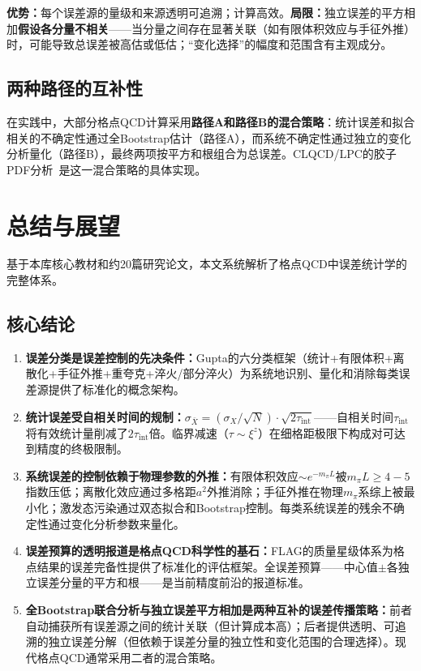\documentclass[12pt,a4paper]{ctexart}
\begin{document}
\textbf{优势：}每个误差源的量级和来源透明可追溯；计算高效。\textbf{局限：}独立误差的平方相加\textbf{假设各分量不相关}——当分量之间存在显著关联（如有限体积效应与手征外推）时，可能导致总误差被高估或低估；``变化选择''的幅度和范围含有主观成分。

\subsection{两种路径的互补性}

在实践中，大部分格点QCD计算采用\textbf{路径A和路径B的混合策略}：统计误差和拟合相关的不确定性通过全Bootstrap估计（路径A），而系统不确定性通过独立的变化分析量化（路径B），最终两项按平方和根组合为总误差。CLQCD/LPC的胶子PDF分析~\cite{Chen2025gluon}是这一混合策略的具体实现。

\section{总结与展望}

基于本库核心教材和约20篇研究论文，本文系统解析了格点QCD中误差统计学的完整体系。

\subsection*{核心结论}

\begin{enumerate}[leftmargin=*]
    \item \textbf{误差分类是误差控制的先决条件：}Gupta的六分类框架（统计+有限体积+离散化+手征外推+重夸克+淬火/部分淬火）为系统地识别、量化和消除每类误差源提供了标准化的概念架构。

    \item \textbf{统计误差受自相关时间的规制：}$\sigma_{\bar X} = (\sigma_X/\sqrt{N})\cdot\sqrt{2\tau_{\text{int}}}$——自相关时间$\tau_{\text{int}}$将有效统计量削减了$2\tau_{\text{int}}$倍。临界减速（$\tau\sim\xi^z$）在细格距极限下构成对可达到精度的终极限制。

    \item \textbf{系统误差的控制依赖于物理参数的外推：}有限体积效应$\sim e^{-m_\pi L}$被$m_\pi L\ge 4-5$指数压低；离散化效应通过多格距$a^2$外推消除；手征外推在物理$m_\pi$系综上被最小化；激发态污染通过双态拟合和Bootstrap控制。每类系统误差的残余不确定性通过变化分析参数来量化。

    \item \textbf{误差预算的透明报道是格点QCD科学性的基石：}FLAG的质量星级体系为格点结果的误差完备性提供了标准化的评估框架。全误差预算——中心值$\pm$各独立误差分量的平方和根——是当前精度前沿的报道标准。

    \item \textbf{全Bootstrap联合分析与独立误差平方相加是两种互补的误差传播策略：}前者自动捕获所有误差源之间的统计关联（但计算成本高）；后者提供透明、可追溯的独立误差分解（但依赖于误差分量的独立性和变化范围的合理选择）。现代格点QCD通常采用二者的混合策略。
\end{enumerate}
\end{document}
